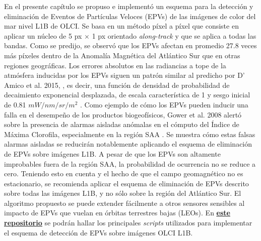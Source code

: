     En el presente capítulo se propuso e implementó un esquema para la detección y eliminación de Eventos de Partículas Veloces (EPVs) de las imágenes de color del mar nivel L1B de OLCI. Se basa en un método píxel a píxel que consiste en aplicar un núcleo de 5 px $\times$ 1 px orientado \textit{along-track} y que se aplica a todas las bandas. Como se predijo, se observó que los EPVs afectan en promedio 27.8 veces más píxeles dentro de la Anomalía Magnética del Atlántico Sur que en otras regiones geográficas. Los errores absolutos en las radiancias a tope de la atmósfera inducidas por los EPVs siguen un patrón similar al predicho por D' Amico et al. 2015, \cite{damico2015}, es decir, una función de densidad de probabilidad de decaimiento exponencial desplazada, de escala característica de 1 y sesgo inicial de 0.81 $mW/nm/sr/m^{2}$ \cite{damico2015}. Como ejemplo de cómo los EPVs pueden inducir una falla en el desempeño de los productos biogeofísicos, Gower et al. 2008 alertó sobre la presencia de alarmas aisladas anómalas en el cómputo del Índice de Máxima Clorofila, especialmente en la región SAA \cite{gower2008b}. Se muestra cómo estas falsas alarmas aisladas se reducirán notablemente aplicando el esquema de eliminación de EPVs sobre imágenes L1B.
    A pesar de que los EPVs son altamente improbables fuera de la región SAA, la probabilidad de ocurrencia no se reduce a cero. Teniendo esto en cuenta y el hecho de que el campo geomagnético no es estacionario, se recomienda aplicar el esquema de eliminación de EPVs descrito sobre todas las imágenes L1B, y no sólo sobre la región del Atlántico Sur. El algoritmo propuesto se puede extender fácilmente a otros sensores sensibles al impacto de EPVs que vuelan en órbitas terrestres bajas (LEOs).  En \href{https://github.com/juanchossn/scripts_tesis_doctoral}{\textbf{\underline{este repositorio}}}\cite{repo} se podrán hallar los principales \textit{scripts} utilizados para implementar el esquema de detección de EPVs sobre imágenes OLCI L1B.